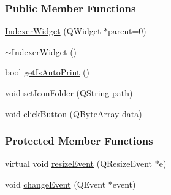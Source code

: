 \subsubsection*{Public Member Functions}
\begin{DoxyCompactItemize}
\item 
\mbox{\hyperlink{classIndexerWidget_a5406b617d20c983f0208d78813f46b13}{Indexer\+Widget}} (Q\+Widget $\ast$parent=0)
\item 
\mbox{\hyperlink{classIndexerWidget_a06e073bb57ddfdbfc21364f8344e10f3}{$\sim$\+Indexer\+Widget}} ()
\item 
bool \mbox{\hyperlink{classIndexerWidget_a7e4a847aba65f7a17c5b6ceaf8a59636}{get\+Is\+Auto\+Print}} ()
\item 
void \mbox{\hyperlink{classIndexerWidget_af3faa0bf1c820ff960f0f4be49ed453b}{set\+Icon\+Folder}} (Q\+String path)
\item 
void \mbox{\hyperlink{classIndexerWidget_abe1eb2eae0c93dff7d5f0d9cbf9cd371}{click\+Button}} (Q\+Byte\+Array data)
\end{DoxyCompactItemize}
\subsubsection*{Protected Member Functions}
\begin{DoxyCompactItemize}
\item 
virtual void \mbox{\hyperlink{classIndexerWidget_a60d4e0e97023327226e6390e9b867fc8}{resize\+Event}} (Q\+Resize\+Event $\ast$e)
\item 
void \mbox{\hyperlink{classIndexerWidget_a6c63cfdeb49de1b9a64a6b3fc8b4d997}{change\+Event}} (Q\+Event $\ast$event)
\end{DoxyCompactItemize}
